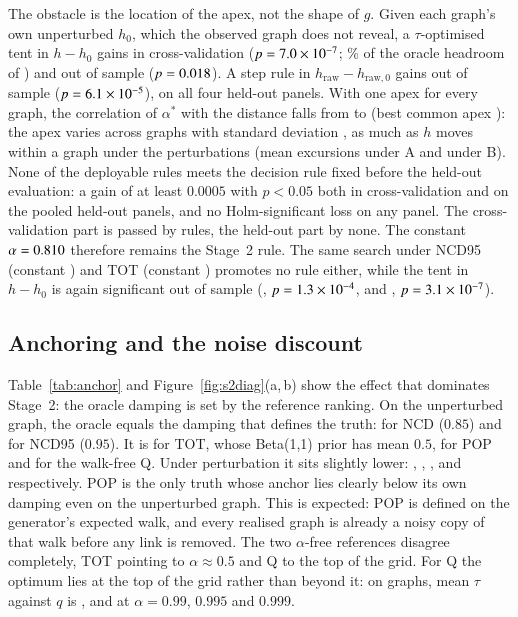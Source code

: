 \documentclass[11pt,a4paper]{article}
\theoremstyle{definition}
\theoremstyle{remark}
\begin{document}
The obstacle is the location of the apex, not the shape of $g$. Given each graph's own unperturbed $h_0$,
which the observed graph does not reveal, a $\tau$-optimised tent in $h-h_0$ gains \NmDhCV{} in
cross-validation ($p=7.0\times10^{-7}$; \NmDhShare\% of the oracle headroom of \NmOracleCalib) and \NmDhHeld{}
out of sample ($p=0.018$). A step rule in $h_{\mathrm{raw}}-h_{\mathrm{raw},0}$ gains \NmDhrawHeld{}
out of sample ($p=6.1\times10^{-5}$), on all four held-out panels. With one apex for every graph, the
correlation of $\alpha^*$ with the distance falls from \NmDistOwn{} to \NmDistGlobal{} (best common apex
\NmDistGlobalC): the apex varies across graphs with standard deviation \NmHzeroSd, as much as $h$ moves
within a graph under the perturbations (mean excursions \NmExcA{} under A and \NmExcB{} under B). None of the \NmRules{} deployable
rules meets the decision rule fixed before the held-out evaluation: a gain of at least $0.0005$ with
$p<0.05$ both in cross-validation and on the pooled held-out panels, and no Holm-significant loss on any
panel. The cross-validation part is passed by \NmMeetsCV{} rules, the held-out part by none. The constant
$\alpha=0.810$ therefore remains the Stage~2 rule. The same search under NCD95 (constant
\NmNfConst) and TOT (constant \NmTotConst) promotes no rule either, while the tent in $h-h_0$ is again
significant out of sample (\NmNfDhHeld, $p=1.3\times10^{-4}$, and \NmTotDhHeld, $p=3.1\times10^{-7}$).



\subsection{Anchoring and the noise discount}
\label{sec:anchor}
Table~\ref{tab:anchor} and Figure~\ref{fig:s2diag}(a,\,b) show the effect that dominates Stage~2: the
oracle damping is set by the reference ranking. On the unperturbed graph, the oracle equals the damping
that defines the truth: \AnchorNcd{} for NCD ($0.85$) and \AnchorNcdnf{} for NCD95 ($0.95$). It is
\AnchorTot{} for TOT, whose Beta(1,1) prior has mean $0.5$, \AnchorPop{} for POP and \AnchorQ{} for the
walk-free Q. Under perturbation it sits slightly lower: \MeanNcd, \MeanNcdnf, \MeanTot, \MeanPop{} and
\MeanQ{} respectively. POP is the only truth whose anchor lies clearly below its own damping even on the
unperturbed graph. This is expected: POP is defined on the generator's expected walk, and every realised
graph is already a noisy copy of that walk before any link is removed. The two $\alpha$-free references
disagree completely, TOT pointing to
$\alpha\approx0.5$ and Q to the top of the grid. For Q the optimum lies at the top of the grid rather
than beyond it: on \QupGraphs{} graphs, mean $\tau$ against $q$ is \QupNine, \QupNineFive{} and
\QupNineNine{} at $\alpha=0.99$, $0.995$ and $0.999$.
\end{document}
